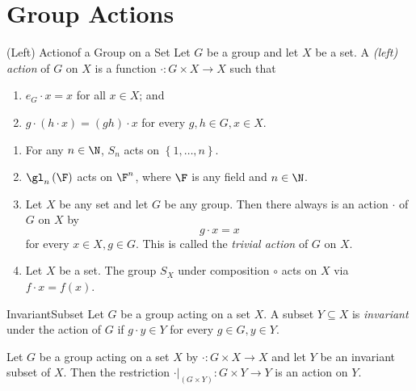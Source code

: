 \documentclass[pmath347]{subfiles}
\begin{document}

    \section{Group Actions}
    
    \begin{definition}{(Left) Action}{of a Group on a Set}
        Let $G$ be a group and let $X$ be a set. A \emph{(left) action} of $G$ on $X$ is a function $\cdot:G\times X\to X$ such that
        \begin{enumerate}
            \item $e_G\cdot x=x$ for all $x\in X$; and
            \item $g\cdot \left( h\cdot x\right) = \left( gh \right) \cdot x$ for every $g,h\in G, x\in X$.
        \end{enumerate}
    \end{definition}

    \begin{enumerate}
        \item For any $n\in\N$, $S_n$ acts on $\left\lbrace 1,\ldots,n \right\rbrace$.
        \item $\gl_n\left( \F \right)$ acts on $\F^n$, where $\F$ is any field and $n\in\N$.
        \item Let $X$ be any set and let $G$ be any group. Then there always is an action $\cdot$ of $G$ on $X$ by
            \begin{equation*}
                g\cdot x = x
            \end{equation*}
            for every $x\in X, g\in G$. This is called the \emph{trivial action} of $G$ on $X$.
        \item Let $X$ be a set. The group $S_X$ under composition $\circ$ acts on $X$ via $f\cdot x = f\left( x \right)$.
    \end{enumerate}

    \begin{definition}{Invariant}{Subset}
        Let $G$ be a group acting on a set $X$. A subset $Y\subseteq X$ is \emph{invariant} under the action of $G$ if $g\cdot y\in Y$ for every $g\in G, y\in Y$.
    \end{definition}

    \begin{prop}{}
        Let $G$ be a group acting on a set $X$ by $\cdot:G\times X\to X$ and let $Y$ be an invariant subset of $X$. Then the restriction $\cdot|_{\left( G\times Y \right)}:G\times Y\to Y$ is an action on $Y$.
    \end{prop}
\end{document}
